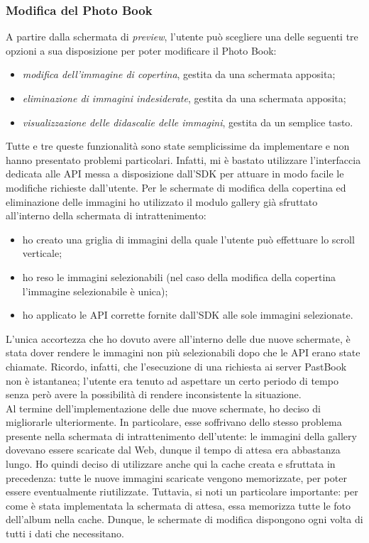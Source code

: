 			\subsubsection{Modifica del Photo Book}
				A partire dalla schermata di \emph{preview}, l'utente può scegliere una delle seguenti tre opzioni a sua
				disposizione per poter modificare il Photo Book:
				\begin{itemize}
					\item \emph{modifica dell'immagine di copertina}, gestita da una schermata apposita;
					\item \emph{eliminazione di immagini indesiderate}, gestita da una schermata apposita;
					\item \emph{visualizzazione delle didascalie delle immagini}, gestita da un semplice tasto.
				\end{itemize}
				Tutte e tre queste funzionalità sono state semplicissime da implementare e non hanno presentato problemi particolari.
				Infatti, mi è bastato utilizzare l'interfaccia dedicata alle API messa a disposizione dall'SDK per attuare in modo
				facile le modifiche richieste dall'utente. Per le schermate di modifica della copertina ed eliminazione delle
				immagini ho utilizzato il modulo gallery già sfruttato all'interno della schermata di intrattenimento:
				\begin{itemize}
					\item ho creato una griglia di immagini della quale l'utente può effettuare lo scroll verticale;
					\item ho reso le immagini selezionabili (nel caso della modifica della copertina l'immagine selezionabile è
					unica);
					\item ho applicato le API corrette fornite dall'SDK alle sole immagini selezionate.
				\end{itemize}
				L'unica accortezza che ho dovuto avere all'interno delle due nuove schermate, è stata dover rendere le
				immagini non più selezionabili dopo che le API erano state chiamate. Ricordo, infatti, che l'esecuzione di una
				richiesta ai server PastBook non è istantanea; l'utente era tenuto ad aspettare un certo periodo di tempo senza però
				avere la possibilità di rendere inconsistente la situazione.\\
				
				\noindent Al termine dell'implementazione delle due nuove schermate, ho deciso di migliorarle ulteriormente. In
				particolare, esse soffrivano dello stesso problema presente nella schermata di intrattenimento dell'utente: le
				immagini della gallery dovevano essere scaricate dal Web, dunque il tempo di attesa era abbastanza lungo. Ho quindi
				deciso di utilizzare anche qui la cache creata e sfruttata in precedenza: tutte le nuove immagini scaricate vengono
				memorizzate, per poter essere eventualmente riutilizzate. Tuttavia, si noti un particolare importante: per come è
				stata implementata la schermata di attesa, essa memorizza tutte le foto dell'album nella cache. Dunque, le schermate
				di modifica dispongono ogni volta di tutti i dati che necessitano.

